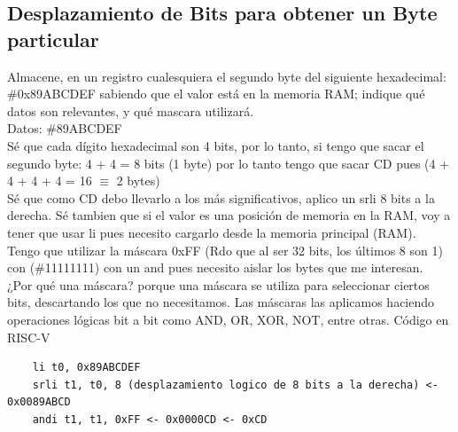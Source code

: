 \documentclass[10pt,a4paper]{article}
\begin{document}
\subsection*{Desplazamiento de Bits para obtener un Byte particular}
\label{subsec:desplazamiento_bits}
Almacene, en un registro cualesquiera el segundo byte del siguiente hexadecimal: \#0x89ABCDEF sabiendo que el valor está en la memoria RAM; indique qué datos son relevantes, y qué mascara utilizará. \\
Datos: \#89ABCDEF \\
Sé que cada dígito hexadecimal son 4 bits, por lo tanto, si tengo que sacar el segundo byte: 4 + 4 = 8 bits (1 byte) por lo tanto tengo que sacar CD pues (4 + 4 + 4 + 4 = 16 $ \equiv $ 2 bytes) \\
Sé que como CD debo llevarlo a los más significativos, aplico un srli 8 bits a la derecha.
Sé tambien que si el valor es una posición de memoria en la RAM, voy a tener que usar li pues necesito cargarlo desde la memoria principal (RAM). \\
Tengo que utilizar la máscara 0xFF (Rdo que al ser 32 bits, los últimos 8 son 1) con (\#11111111) con un and pues necesito aislar los bytes que me interesan. \\
¿Por qué una máscara? porque una máscara se utiliza para seleccionar ciertos bits, descartando los que no necesitamos. Las máscaras las aplicamos haciendo operaciones lógicas bit a bit como AND, OR, XOR, NOT, entre otras.
Código en RISC-V
\begin{lstlisting}
    li t0, 0x89ABCDEF
    srli t1, t0, 8 (desplazamiento logico de 8 bits a la derecha) <- 0x0089ABCD
    andi t1, t1, 0xFF <- 0x0000CD <- 0xCD
\end{lstlisting}
\end{document}
